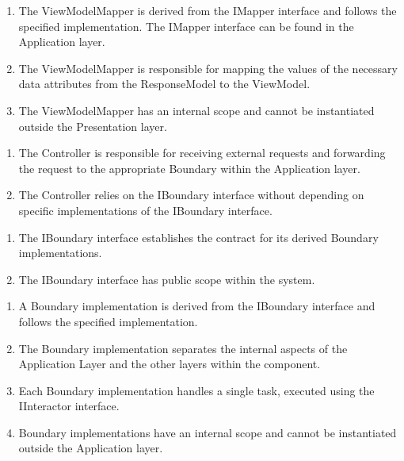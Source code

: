 \begin{enumerate}[label=\themycounter.\arabic*]
    \item The ViewModelMapper is derived from the IMapper interface and follows the
    specified implementation. The IMapper interface can be found in the Application layer.
    \item The ViewModelMapper is responsible for mapping the values of the necessary data
    attributes from the ResponseModel to the ViewModel.
    \item The ViewModelMapper has an internal scope and cannot be instantiated outside the
    Presentation layer.
\end{enumerate}

\begin{enumerate}[label=\themycounter.\arabic*]
    \item The Controller is responsible for receiving external requests and forwarding the
    request to the appropriate Boundary within the Application layer.
    \item The Controller relies on the IBoundary interface without depending on specific
    implementations of the IBoundary interface.
\end{enumerate}

\begin{enumerate}[label=\themycounter.\arabic*]
    \item The IBoundary interface establishes the contract for its derived Boundary
    implementations.
    \item The IBoundary interface has public scope within the system.
\end{enumerate}

\begin{enumerate}[label=\themycounter.\arabic*]
    \item A Boundary implementation is derived from the IBoundary interface and follows
    the specified implementation.
    \item The Boundary implementation separates the internal aspects of the Application
    Layer and the other layers within the component.
    \item Each Boundary implementation handles a single task, executed using the
    IInteractor interface.
    \item Boundary implementations have an internal scope and cannot be instantiated
    outside the Application layer.
\end{enumerate}


